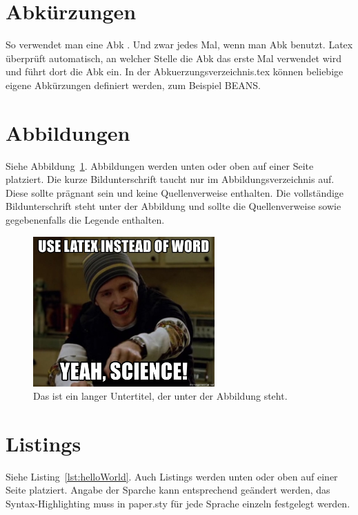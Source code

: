 \documentclass{iwi}
\begin{document}
\section{Abkürzungen} \label{sec:Abkürzungen}

So verwendet man eine \gls{Abk} . Und zwar jedes Mal, wenn man \gls{Abk} benutzt. 
Latex überprüft automatisch, an welcher Stelle die \gls{Abk} das erste Mal verwendet wird und führt dort die \gls{Abk} ein.
In der Abkuerzungsverzeichnis.tex können beliebige eigene Abkürzungen definiert werden, zum Beispiel \gls{BEANS}.

\section{Abbildungen} \label{sec:Abbildungen}

Siehe Abbildung~\ref{img:meme}. Abbildungen werden unten oder oben auf einer Seite platziert. 
Die kurze Bildunterschrift taucht nur im Abbildungsverzeichnis auf.
Diese sollte prägnant sein und keine Quellenverweise enthalten.
Die vollständige Bildunterschrift steht unter der Abbildung und sollte die Quellenverweise sowie gegebenenfalls die Legende enthalten.

\begin{figure}
    \centering
    \includegraphics[width = 0.62\textwidth]{img/science.jpg}
    \caption[Das ist ein kurzer Untertitel]{Das ist ein langer Untertitel, der unter der Abbildung steht.}
    \label{img:meme}
\end{figure}

\section{Listings} \label{sec:Listings}

Siehe Listing~\ref{lst:helloWorld}. Auch Listings werden unten oder oben auf einer Seite platziert. 
Angabe der Sparche kann entsprechend geändert werden, das Syntax-Highlighting muss in paper.sty für jede Sprache einzeln festgelegt werden.
\end{document}
